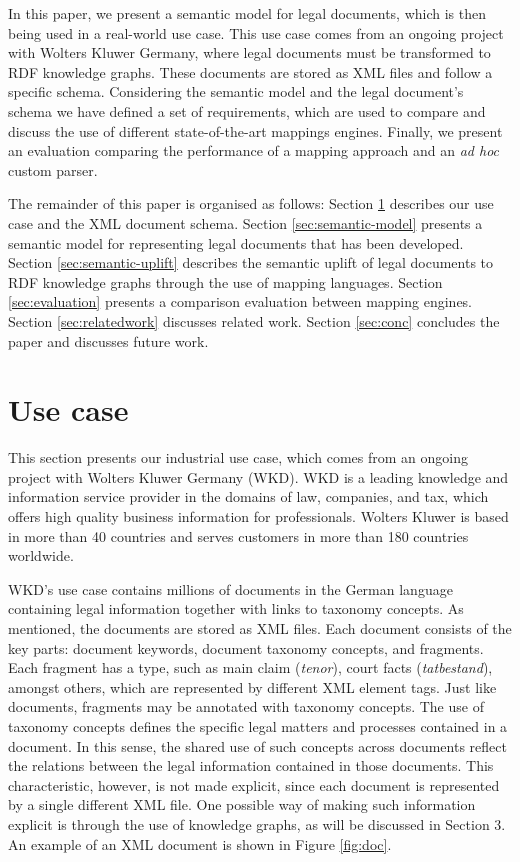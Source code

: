 \documentclass[runningheads]{llncs}
\begin{document}
In this paper, we present a semantic model for legal documents, which is then being used in a real-world use case. This use case comes from an ongoing project with Wolters Kluwer Germany, where legal documents must be transformed to RDF knowledge graphs. These documents are stored as XML files and follow a specific schema. Considering the semantic model and the legal document's schema we have defined a set of requirements, which are used to compare and discuss the use of different state-of-the-art mappings engines. Finally, we present an evaluation comparing the performance of a mapping approach and an \textit{ad hoc} custom parser.

The remainder of this paper is organised as follows: Section \ref{sec:use-case} describes our use case and the XML document schema. Section \ref{sec:semantic-model} presents a semantic model for representing legal documents that has been developed. Section \ref{sec:semantic-uplift} describes the semantic uplift of legal documents to RDF knowledge graphs through the use of mapping languages. Section \ref{sec:evaluation} presents a comparison evaluation between mapping engines. Section \ref{sec:relatedwork} discusses related work. Section \ref{sec:conc} concludes the paper and discusses future work.

\section{Use case}\label{sec:use-case}

This section presents our industrial use case, which comes from an ongoing project with Wolters Kluwer Germany (WKD). WKD is a leading knowledge and information service provider in the domains of law, companies, and tax, which offers high quality business information for professionals. Wolters Kluwer is based in more than 40 countries and serves customers in more than 180 countries worldwide.

WKD's use case contains millions of documents in the German language containing legal information together with links to taxonomy concepts. As mentioned, the documents are stored as XML files. Each document consists of the key parts: document keywords, document taxonomy concepts, and fragments. Each fragment has a type, such as main claim (\textit{tenor}), court facts (\textit{tatbestand}), amongst others, which are represented by different XML element tags. Just like documents, fragments may be annotated with taxonomy concepts. The use of taxonomy concepts defines the specific legal matters and processes contained in a document. In this sense, the shared use of such concepts across documents reflect the relations between the legal information contained in those documents. This characteristic, however, is not made explicit, since each document is represented by a single different XML file. One possible way of making such information explicit is through the use of knowledge graphs, as will be discussed in Section 3. An example of an XML document is shown in Figure \ref{fig:doc}.
\end{document}
